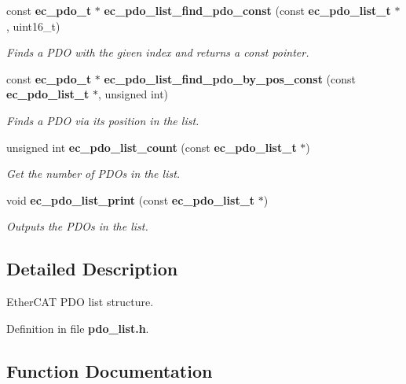 \begin{DoxyCompactItemize}
const {\bf ec\-\_\-pdo\-\_\-t} $\ast$ {\bf ec\-\_\-pdo\-\_\-list\-\_\-find\-\_\-pdo\-\_\-const} (const {\bf ec\-\_\-pdo\-\_\-list\-\_\-t} $\ast$, uint16\-\_\-t)
\begin{DoxyCompactList}\small\item\em \-Finds a \-P\-D\-O with the given index and returns a const pointer. \end{DoxyCompactList}\item 
const {\bf ec\-\_\-pdo\-\_\-t} $\ast$ {\bf ec\-\_\-pdo\-\_\-list\-\_\-find\-\_\-pdo\-\_\-by\-\_\-pos\-\_\-const} (const {\bf ec\-\_\-pdo\-\_\-list\-\_\-t} $\ast$, unsigned int)
\begin{DoxyCompactList}\small\item\em \-Finds a \-P\-D\-O via its position in the list. \end{DoxyCompactList}\item 
unsigned int {\bf ec\-\_\-pdo\-\_\-list\-\_\-count} (const {\bf ec\-\_\-pdo\-\_\-list\-\_\-t} $\ast$)
\begin{DoxyCompactList}\small\item\em \-Get the number of \-P\-D\-Os in the list. \end{DoxyCompactList}\item 
void {\bf ec\-\_\-pdo\-\_\-list\-\_\-print} (const {\bf ec\-\_\-pdo\-\_\-list\-\_\-t} $\ast$)\label{pdo__list_8h_ac7e42782cb2774a74ffd38e792e7da7c}

\begin{DoxyCompactList}\small\item\em \-Outputs the \-P\-D\-Os in the list. \end{DoxyCompactList}\end{DoxyCompactItemize}


\subsection{\-Detailed \-Description}
\-Ether\-C\-A\-T \-P\-D\-O list structure. 

\-Definition in file {\bf pdo\-\_\-list.\-h}.



\subsection{\-Function \-Documentation}
